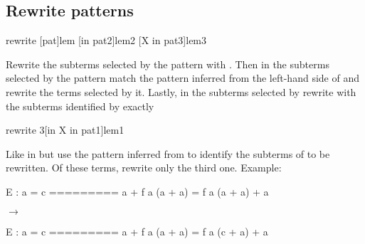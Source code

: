 \begin{landscape}
\begin{small}
\begin{multicols*}{3}[\begin{center}\section*{}\end{center}]
% 
% 


\subsection*{Rewrite patterns}

\begin{cheat}
rewrite [pat]lem [in pat2]lem2 [X in pat3]lem3
\end{cheat}
  Rewrite the subterms selected by the pattern  with .
  Then in the subterms selected by the pattern 
  match the pattern inferred from the left-hand side of  and
  rewrite the terms selected by it. Lastly, in the subterms selected by
   rewrite with  the subterms identified by  exactly

\begin{cheat}
rewrite {3}[in X in pat1]lem1
\end{cheat}
  Like in  but use the pattern
  inferred from  to identify the subterms of  to be
  rewritten. Of these terms, rewrite only the third one. Example:

\begin{cheatout}
E : a = c
=========
a + f a (a + a) =
  f a (a + a) + a
\end{cheatout}
$\to$
\begin{cheatout}
E : a = c
=========
a + f a (a + a) =
  f a (c + a) + a
\end{cheatout}




\end{multicols*}
\end{small}
\end{landscape}
